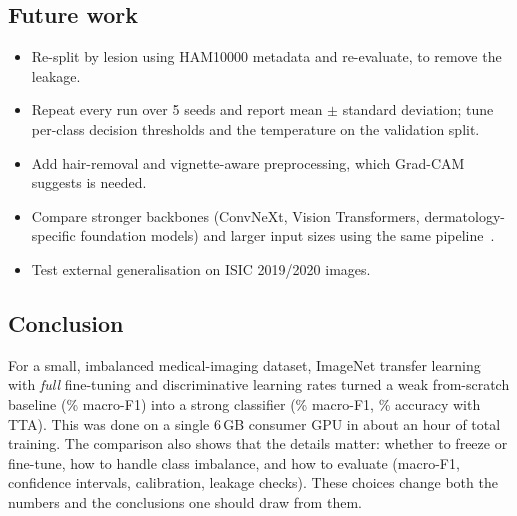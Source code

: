 \subsection{Future work}
\begin{itemize}
  \item Re-split by lesion using HAM10000 metadata and re-evaluate, to remove the leakage.
  \item Repeat every run over 5 seeds and report mean $\pm$ standard deviation; tune per-class decision thresholds
        and the temperature on the validation split.
  \item Add hair-removal and vignette-aware preprocessing, which Grad-CAM suggests is needed.
  \item Compare stronger backbones (ConvNeXt, Vision Transformers, dermatology-specific foundation models) and
        larger input sizes using the same pipeline~\cite{medmnistplus}.
  \item Test external generalisation on ISIC 2019/2020 images.
\end{itemize}

\subsection{Conclusion}
For a small, imbalanced medical-imaging dataset, ImageNet transfer learning with \emph{full} fine-tuning and
discriminative learning rates turned a weak from-scratch baseline (\ScratchFOne\% macro-F1) into a strong
classifier (\RFineFOneTTA\% macro-F1, \RFineAccTTA\% accuracy with TTA). This was done on a single 6\,GB consumer
GPU in about an hour of total training. The comparison also shows that the details matter: whether to freeze
or fine-tune, how to handle class imbalance, and how to evaluate (macro-F1, confidence intervals, calibration,
leakage checks). These choices change both the numbers and the conclusions one should draw from them.
